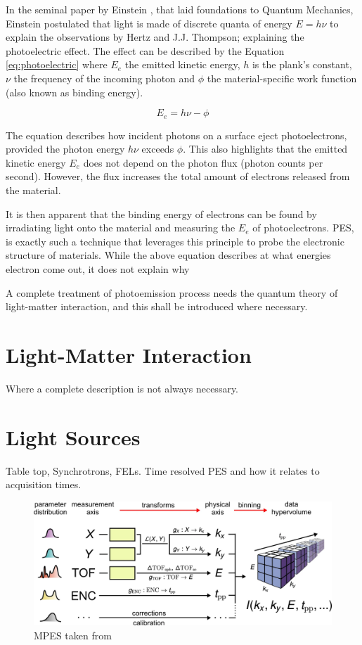 In the seminal paper by Einstein \cite{einsteinUberErzeugungUnd1905}, that laid foundations to Quantum Mechanics, Einstein postulated that light is made of discrete quanta of energy $E = h\nu$ to explain the observations by Hertz and J.J. Thompson; explaining the photoelectric effect. The effect can be described by the Equation \ref{eq:photoelectric} where $E_e$ the emitted kinetic energy, $h$ is the plank's constant, $\nu$ the frequency of the incoming photon and  $\phi$ the material-specific work function (also known as binding energy). 

\begin{equation}\label{eq:photoelectric}
    E_e = h\nu - \phi
\end{equation}

The equation describes how incident photons on a surface eject photoelectrons, provided the photon energy $h\nu$ exceeds $\phi$. This also highlights that the emitted kinetic energy $E_e$ does not depend on the photon flux (photon counts per second). However, the flux increases the total amount of electrons released from the material.

It is then apparent that the binding energy of electrons can be found by irradiating light onto the material and measuring the $E_e$ of photoelectrons. \gls{PES}, is exactly such a technique that leverages this principle to probe the electronic structure of materials. While the above equation describes at what energies electron come out, it does not explain why 



A complete treatment of photoemission process needs the quantum theory of light-matter interaction, and this shall be introduced where necessary. 

\section{Light-Matter Interaction}
Where a complete description is not always necessary.
\section{Light Sources}
Table top, Synchrotrons, FELs. Time resolved PES and how it relates to acquisition times.

\begin{figure}
    \centering
    \includegraphics[width=1\linewidth]{images/2024-08-25-22-36-44.png}
    \caption{MPES taken from \cite{xianOpensourceEndtoendWorkflow2020}}
\end{figure}


